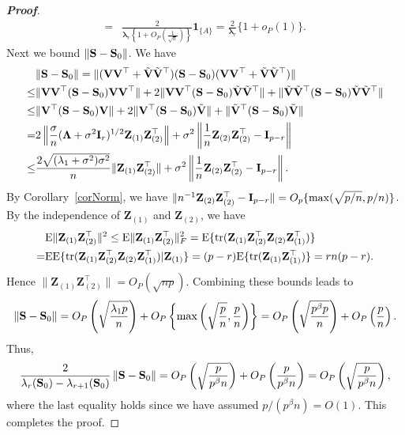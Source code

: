 \documentclass[times,sort&compress,3p]{elsarticle}
\newcommand{\mytr}{ {\rm tr} }
\newcommand{\myE}{ {\rm E} }
\newcommand{\bZ}{\mathbf{Z}}
\newcommand{\bfsym}[1]{\ensuremath{\boldsymbol{#1}}}
\def\blambda {\bfsym {\lambda}}        \def\bLambda {\bfsym {\Lambda}}
\theoremstyle{plain}
\theoremstyle{definition}
\theoremstyle{remark}
\begin{document}
\begin{appendices}
\begin{proof}[\textbf{Proof}]
\begin{align*}
    =&\frac{2}{\blambda_r\left\{1+O_P\left(\frac{1}{\sqrt{n}}\right)\right\}}\mathbf{1}_{\{A\}}
    =\frac{2}{\blambda_r}\{1+o_P(1)\}.
\end{align*}
    Next we bound $\|\mathbf{S}-\mathbf{S}_0\|$. 
    We have
    \begin{align*}
        &\|\BS-\BS_0\|=
        \|(\BV\BV^\top +\tilde{\BV}\tilde{\BV}^\top )(\BS-\BS_0)(\BV\BV^\top +\tilde{\BV}\tilde{\BV}^\top )\|\\
        \leq& \|\BV\BV^\top  (\BS-\BS_0) \BV\BV^\top \|+2 \|\BV\BV^\top  (\BS-\BS_0) \tilde{\BV}\tilde{\BV}^\top \|+\|\tilde{\BV}\tilde{\BV}^\top  (\BS-\BS_0) \tilde{\BV}\tilde{\BV}^\top \|\\
        \leq& \|\BV^\top  (\BS-\BS_0) \BV\|+2 \|\BV^\top  (\BS-\BS_0) \tilde{\BV}\|+\|\tilde{\BV}^\top  (\BS-\BS_0) \tilde{\BV}\|\\
        = &
        2\left\|\frac{\sigma}{n}(\bLambda+\sigma^2 \BI_r)^{1/2}\bZ_{(1)} \bZ_{(2)}^\top \right\|+
        \sigma^2\left\|\frac{1}{n}\bZ_{(2)} \bZ_{(2)}^\top - \BI_{p-r}\right\|\\
        \leq & \frac{2\sqrt{(\lambda_1+\sigma^2)\sigma^2}}{n}\|\bZ_{(1)}\bZ_{(2)}^\top \|+
        \sigma^2\left\|\frac{1}{n}\bZ_{(2)} \bZ_{(2)}^\top - \BI_{p-r}\right\|.
    \end{align*}
    By Corollary~\ref{corNorm}, we have $\|n^{-1}\bZ_{(2)} \bZ_{(2)}^\top - \BI_{p-r}\|=O_p\{\max(\sqrt{p/n},p/n)\}$.
    By the independence of $\bZ_{(1)}$ and $\bZ_{(2)}$, we have
\begin{align*}
    &\myE \|\bZ_{(1)}\bZ_{(2)}^\top \|^2\leq
\myE \|\bZ_{(1)}\bZ_{(2)}^\top \|_F^2
=
\myE \{ \mytr(\bZ_{(1)}\bZ_{(2)}^\top \bZ_{(2)}\bZ_{(1)}^\top ) \}\\
    =&
    \myE\myE \{ \mytr(\bZ_{(1)}\bZ_{(2)}^\top \bZ_{(2)}\bZ_{(1)}^\top )|\BZ_{(1)} \}
    =(p-r)
\myE \{ \mytr(\bZ_{(1)}\bZ_{(1)}^\top ) \}
    =rn(p-r).
\end{align*}
    Hence $\|\bZ_{(1)}\bZ_{(2)}^\top \|=O_P(\sqrt{np})$.
    Combining these bounds leads to
    $$
    \|\mathbf{S}-\mathbf{S}_0\|=
O_P\left(\sqrt{\frac{\lambda_1 p}{n}}\right)+O_P\left\{\max\left(\sqrt{\frac{p}{n}},\frac{p}{n}\right)\right\}
    =
    O_P\left(\sqrt{\frac{ p^{\beta}p}{n}}\right)+O_P\left(\frac{p}{n}\right).
    $$
    Thus,
    $$
   \frac{2}{\lambda_r(\mathbf{S}_0)-\lambda_{r+1}(\mathbf{S}_0)}\left\|\mathbf{S}-\mathbf{S}_0\right\|=
    O_P\left(\sqrt{\frac{p}{p^{\beta}n}}\right)+O_P\left(\frac{p}{p^{\beta}n}\right)=
O_P\left(\sqrt{\frac{p}{p^{\beta}n}}\right),
    $$
    where the last equality holds since we have assumed $p/(p^{\beta}n)=O(1)$.
    This completes the proof.


\end{proof}
\end{appendices}
\end{document}
